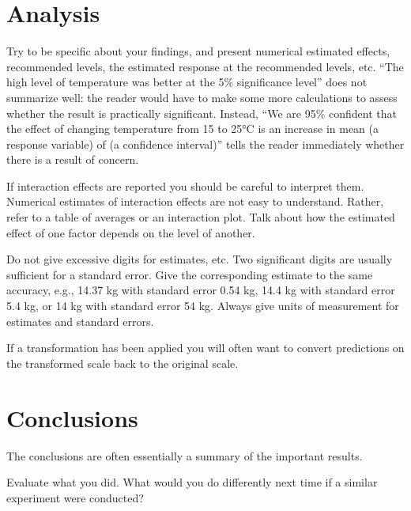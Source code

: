 \documentclass[12pt,a4paper]{article}
\begin{document}
\section{Analysis}

Try to be specific about your findings, and present numerical
estimated effects, recommended levels, the estimated response at the recommended levels,
etc. ``The high level of temperature was better at the 5\% significance level'' does not
summarize well: the reader would have to make some more calculations to assess whether
the result is practically significant. Instead, ``We are 95\% confident that the effect of
changing temperature from 15 to 25°C is an increase in mean (a response variable) of (a
confidence interval)'' tells the reader immediately whether there is a result of concern.

If interaction effects are reported you should be careful to interpret them. Numerical
estimates of interaction effects are not easy to understand. Rather, refer to a table of
averages or an interaction plot. Talk about how the estimated effect of one factor depends
on the level of another.

Do not give excessive digits for estimates, etc. Two significant digits are usually suﬀicient
for a standard error. Give the corresponding estimate to the same accuracy, e.g., 14.37 kg
with standard error 0.54 kg, 14.4 kg with standard error 5.4 kg, or 14 kg with standard
error 54 kg. Always give units of measurement for estimates and standard errors.

If a transformation has been applied you will often want to convert predictions on the
transformed scale back to the original scale.

\section{Conclusions}

The conclusions are often essentially a summary of the
important results.

Evaluate what you did. What would you do differently next time if a similar experiment
were conducted?



\printbibliography




\end{document}
